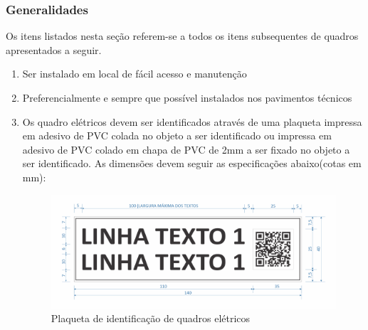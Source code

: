 \subsubsection{Generalidades}

Os itens listados nesta seção referem-se a todos os itens subsequentes de quadros apresentados a seguir.

\begin{enumerate}
	\item Ser instalado em local de fácil acesso e manutenção
	\item Preferencialmente e sempre que possível instalados nos pavimentos técnicos
	\item Os quadro elétricos devem ser identificados através de uma plaqueta impressa em adesivo de PVC colada no objeto a ser identificado ou impressa em adesivo de PVC colado em chapa de PVC de 2mm a ser fixado no objeto a ser identificado. As dimensões devem seguir as especificações abaixo(cotas em mm):
	\begin{figure}[H]
		\centering
	\includegraphics[scale=.85]{Figures/6. Distribution/PLACAS_QUADROS_ELETRICA-01.png}
	\caption{Plaqueta de identificação de quadros elétricos}
	\label{fig:plaqueta01}
	\end{figure}
\end{enumerate}